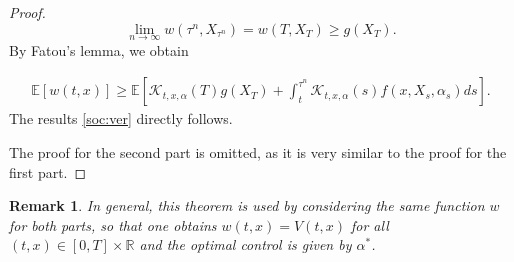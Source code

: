 \documentclass{article}
\newtheorem{rk}{Remark}
\begin{document}
\begin{proof}
\begin{equation*}
\lim_{n\rightarrow\infty}w(\tau^n,X_{\tau^n})=w(T,X_T)\geq g(X_T).
\end{equation*}
By Fatou's lemma, we obtain

\begin{equation*}
\begin{aligned}
\mathbb{E}[w(t,x)]\geq\mathbb{E}\left[\mathcal{K}_{t,x,\alpha}(T)g(X_T)+\int^{\tau^n}_t\mathcal{K}_{t,x,\alpha}(s)f(x,X_s,\alpha_s)ds\right].
\end{aligned}
\end{equation*}
The results \eqref{soc:ver} directly follows. 

The proof for the second part is omitted, as it is very similar to the proof for the first part. 

\end{proof}

\begin{rk}
In general, this theorem is used by considering the same function $w$ for both parts, so that one obtains $w(t,x)=V(t,x)$ for all $(t,x)\in[0,T]\times\mathbb{R}$ and the optimal control is given by $\alpha^*$.
\end{rk}
\end{document}
